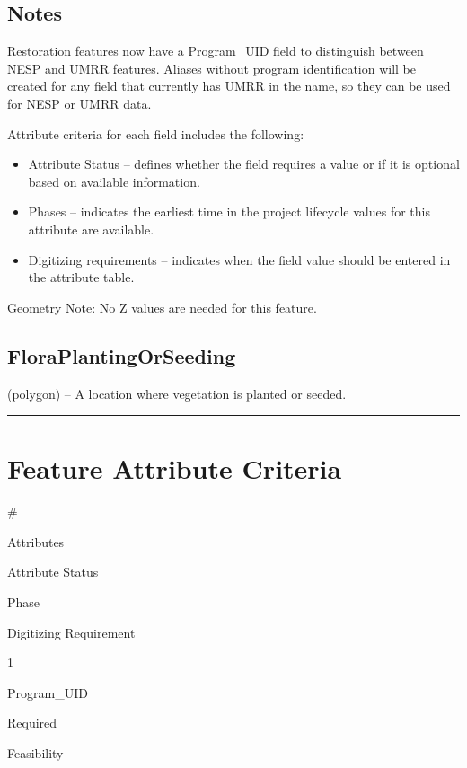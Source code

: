 \documentclass[
  letterpaper,
  DIV=11,
  numbers=noendperiod]{scrreprt}
\providecommand{\tightlist}{%
  \setlength{\itemsep}{0pt}\setlength{\parskip}{0pt}}
\begin{document}
\subsection{Notes}\label{notes-6}

Restoration features now have a Program\_UID field to distinguish
between NESP and UMRR features. Aliases without program identification
will be created for any field that currently has UMRR in the name, so
they can be used for NESP or UMRR data.

Attribute criteria for each field includes the following:

\begin{itemize}
\tightlist
\item
  Attribute Status -- defines whether the field requires a value or if
  it is optional based on available information.
\item
  Phases -- indicates the earliest time in the project lifecycle values
  for this attribute are available.
\item
  Digitizing requirements -- indicates when the field value should be
  entered in the attribute table.
\end{itemize}

Geometry Note: No Z values are needed for this feature.

\subsection{FloraPlantingOrSeeding}\label{floraplantingorseeding}

(polygon) -- A location where vegetation is planted or seeded.

\begin{center}\rule{0.5\linewidth}{0.5pt}\end{center}

\section{Feature Attribute Criteria}\label{feature-attribute-criteria-4}

\#

Attributes

Attribute Status

Phase

Digitizing Requirement

1

Program\_UID

Required

Feasibility
\end{document}
